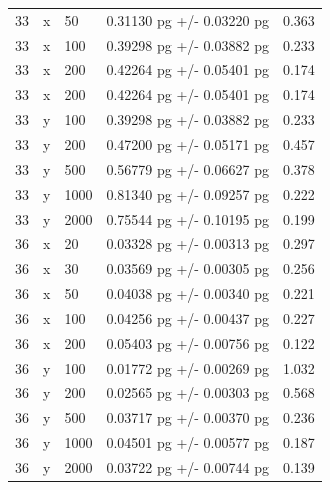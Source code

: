 \documentclass[12pt]{article}
\begin{document}
\begin{longtable}{lllll}
33        & x        & 50   & 0.31130 pg +/- 0.03220 pg    & 0.363                  \\
33        & x        & 100  & 0.39298 pg +/- 0.03882 pg    & 0.233                  \\
33        & x        & 200  & 0.42264 pg +/- 0.05401 pg    & 0.174                  \\
33        & x        & 200  & 0.42264 pg +/- 0.05401 pg    & 0.174                  \\
33        & y        & 100  & 0.39298 pg +/- 0.03882 pg    & 0.233                  \\
33        & y        & 200  & 0.47200 pg +/- 0.05171 pg    & 0.457                  \\
33        & y        & 500  & 0.56779 pg +/- 0.06627 pg    & 0.378                  \\
33        & y        & 1000 & 0.81340 pg +/- 0.09257 pg    & 0.222                  \\
33        & y        & 2000 & 0.75544 pg +/- 0.10195 pg    & 0.199                  \\
36        & x        & 20   & 0.03328 pg +/- 0.00313 pg    & 0.297                  \\
36        & x        & 30   & 0.03569 pg +/- 0.00305 pg    & 0.256                  \\
36        & x        & 50   & 0.04038 pg +/- 0.00340 pg    & 0.221                  \\
36        & x        & 100  & 0.04256 pg +/- 0.00437 pg    & 0.227                  \\
36        & x        & 200  & 0.05403 pg +/- 0.00756 pg    & 0.122                  \\
36        & y        & 100  & 0.01772 pg +/- 0.00269 pg    & 1.032                  \\
36        & y        & 200  & 0.02565 pg +/- 0.00303 pg    & 0.568                  \\
36        & y        & 500  & 0.03717 pg +/- 0.00370 pg    & 0.236                  \\
36        & y        & 1000 & 0.04501 pg +/- 0.00577 pg    & 0.187                  \\
36        & y        & 2000 & 0.03722 pg +/- 0.00744 pg    & 0.139                  \\
\end{longtable}
\end{document}

